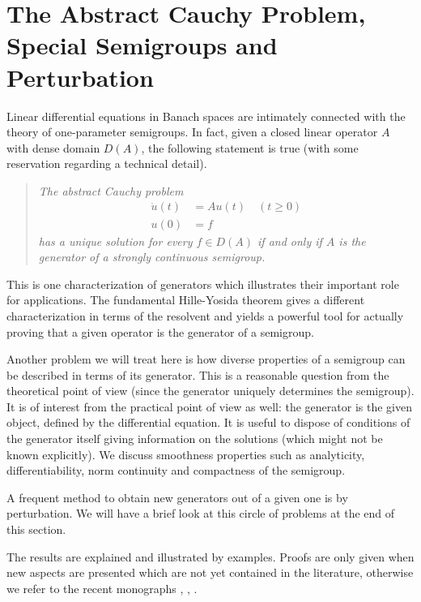 \section{The Abstract Cauchy Problem, Special Semigroups and Perturbation} \label{sec:a2-1}%
\hspace{1cm}{\Large by Wolfgang Arendt}
\vspace{.5cm}
\newline
Linear differential equations in Banach spaces are intimately connected with the theory of one-parameter semigroups.
In fact, given a closed linear operator $A$ with dense domain $D(A)$, the following statement is true (with some reservation regarding a technical detail).
\begin{quote}
\textit{The abstract Cauchy problem}
\begin{align*}
	\dot{u}(t) &= Au(t) \quad (t \geq 0) \\
	u(0) &= f 
\end{align*}
\textit{has a unique solution for every $f \in D(A)$ if and only if\/ $A$ is the generator of a strongly continuous semigroup.}
\end{quote}
This is one characterization of generators which illustrates their important role for applications.
The fundamental Hille-Yosida theorem gives a different characterization in terms of the resolvent and yields a powerful tool for actually proving that a given operator is the generator of a semigroup.

Another problem we will treat here is how diverse properties of a semigroup can be described in terms of its generator.
This is a reasonable question from the theoretical point of view (since the generator uniquely determines the semigroup).
It is of interest from the practical point of view as well: the generator is the given object, defined by the differential equation.
It is useful to dispose of conditions of the generator itself giving information on the solutions (which might not be known explicitly).
We discuss smoothness properties such as analyticity, differentiability, norm continuity and compactness of the semigroup.

A frequent method to obtain new generators out of a given one is by perturbation.
We will have a brief look at this circle of problems at the end of this section.

The results are explained and illustrated by examples.
Proofs are only given when new aspects are presented which are not yet contained in the literature, otherwise we refer to the recent monographs \textcite{davies:1980}, \textcite{goldstein:1985a}, \textcite{pazy:1983}.
